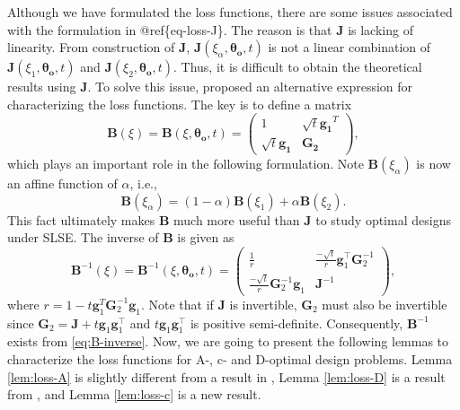 \documentclass[
]{book}
\theoremstyle{definition}
\theoremstyle{definition}
\theoremstyle{definition}
\theoremstyle{definition}
\theoremstyle{remark}
\begin{document}
Although we have formulated the loss functions, there are some issues associated with the formulation in @ref\{eq-loss-J\}. The reason is that \(\boldsymbol{J}\) is lacking of linearity. From construction of \(\boldsymbol{J}\), \(\boldsymbol{J}(\xi_{\alpha},\boldsymbol{\theta_o},t)\) is not a linear combination of \(\boldsymbol{J}(\xi_{1},\boldsymbol{\theta_o},t)\) and \(\boldsymbol{J}(\xi_{2},\boldsymbol{\theta_o},t)\). Thus, it is difficult to obtain the theoretical results using \(\boldsymbol{J}\). To solve this issue, \citet{gao2017d} proposed an alternative expression for characterizing the loss functions. The key is to define a matrix
\begin{equation}
\boldsymbol{B}(\xi)=\boldsymbol{B}(\xi,\boldsymbol{\theta_o},t)=
\begin{pmatrix}
1               &   \sqrt{t}\boldsymbol{g_1}^T\\
\sqrt{t}\boldsymbol{g_1}    &   \boldsymbol{G_2}
\end{pmatrix},
 \label{eq:B-matrix}
\end{equation}
which plays an important role in the following formulation. Note \(\boldsymbol{B}(\xi_{\alpha})\) is now an affine function of \(\alpha\), i.e.,
\[ \boldsymbol{B}(\xi_{\alpha})=(1-\alpha)\boldsymbol{B}(\xi_1)+\alpha\boldsymbol{B}(\xi_2).\]
This fact ultimately makes \(\boldsymbol{B}\) much more useful than \(\boldsymbol{J}\) to study optimal designs under SLSE. The inverse of \(\boldsymbol{B}\) is given as
\begin{equation}
\boldsymbol{B}^{-1}(\xi)=\boldsymbol{B}^{-1}(\xi,\boldsymbol{\theta_o},t)   =\begin{pmatrix}
\frac{1}{r}             &   \frac{-\sqrt{t}}{r}\boldsymbol{g}_1^\top\boldsymbol{G}_2^{-1}   \\
\frac{-\sqrt{t}}{r}\boldsymbol{G}_2^{-1}\boldsymbol{g}_1    &\boldsymbol{J}^{-1}
\end{pmatrix},
 \label{eq:B-inverse}
\end{equation}
where \(r=1-t\boldsymbol{g}_1^T\boldsymbol{G}_2^{-1}\boldsymbol{g}_1\). Note that if \(\boldsymbol{J}\) is invertible, \(\boldsymbol{G}_2\) must also be invertible since \(\boldsymbol{G}_2=\boldsymbol{J}+t\boldsymbol{g}_1\boldsymbol{g}_1^\top\) and \(t\boldsymbol{g}_1\boldsymbol{g}_1^\top\) is positive semi-definite. Consequently, \(\boldsymbol{B}^{-1}\) exists from \eqref{eq:B-inverse}. Now, we are going to present the following lemmas to characterize the loss functions for A-, c- and D-optimal design problems. Lemma \ref{lem:loss-A} is slightly different from a result in \citet{yin2018optimal}, Lemma \ref{lem:loss-D} is a result from \citet{gao2017d}, and Lemma \ref{lem:loss-c} is a new result.
\end{document}
